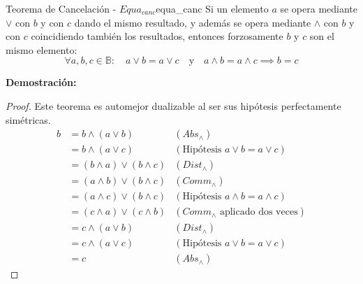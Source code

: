 \documentclass[12pt,a4paper]{article}
\newcommand{\desplegable}[2]{%
  \par\vspace{1ex}\noindent
  \textbf{Demostración:}
  \vspace{1ex}
  
  #2
  \par\vspace{1ex}
}
\begin{document}
\begin{teorema}{Teorema de Cancelación - $Equa_{canc}$}{equa_canc}
Si un elemento $a$ se opera mediante $\vee$ con $b$ y con $c$ dando el mismo resultado, y además se opera mediante $\wedge$ con $b$ y con $c$ coincidiendo también los resultados, entonces forzosamente $b$ y $c$ son el mismo elemento:
\[ \forall a, b, c \in \mathbb{B}: \quad a \vee b = a \vee c \quad \text{y} \quad a \wedge b = a \wedge c \implies b = c \]
\end{teorema}
\desplegable{proof_equa_canc}{
\begin{proof}
Este teorema es automejor dualizable al ser sus hipótesis perfectamente simétricas.
\begin{align*}
    b &= b \wedge (a \vee b) & (Abs_\wedge) \\
      &= b \wedge (a \vee c) & (\text{Hipótesis } a \vee b = a \vee c) \\
      &= (b \wedge a) \vee (b \wedge c) & (Dist_\wedge) \\
      &= (a \wedge b) \vee (b \wedge c) & (Comm_\wedge) \\
      &= (a \wedge c) \vee (b \wedge c) & (\text{Hipótesis } a \wedge b = a \wedge c) \\
      &= (c \wedge a) \vee (c \wedge b) & (Comm_\wedge \text{ aplicado dos veces}) \\
      &= c \wedge (a \vee b) & (Dist_\wedge) \\
      &= c \wedge (a \vee c) & (\text{Hipótesis } a \vee b = a \vee c) \\
      &= c & (Abs_\wedge)
\end{align*}
\end{proof}
}
\end{document}
